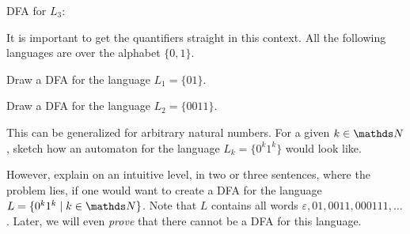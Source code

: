 \documentclass{exercise}
\begin{document}
\begin{solution}
\begin{taskitems}
      \newpage
      \item DFA for $L_3$:\\[10pt]
    \end{taskitems}
  \end{solution}

\subtask It is important to get the quantifiers straight in this context.  All the following
  languages are over the alphabet $\{0,1\}$.
  \begin{taskitems}
    \item Draw a DFA for the language $L_1=\{01\}$.
    \item Draw a DFA for the language $L_2=\{0011\}$.
    \item This can be generalized for arbitrary natural numbers.  For a given $k\in\nat$,
      sketch how an automaton for the language $L_k=\{0^k1^k\}$ would look like. 
    \item However, explain on an intuitive level, in two or three sentences, where the problem lies, if one
      would want to create a DFA for the language $L=\{0^k1^k\mid k\in\nat\}$.  Note that $L$ contains all words
      $\varepsilon,01,0011,000111,\dots$.  Later, we will even \emph{prove} that there
      cannot be a DFA for this language.
  \end{taskitems}
\end{document}
